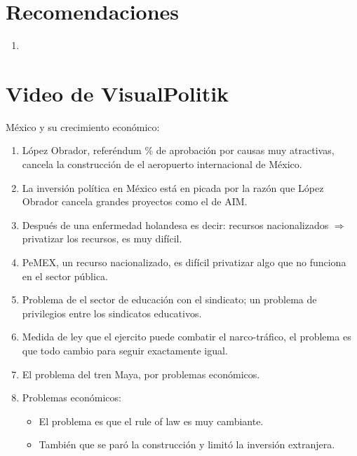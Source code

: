 \section{Recomendaciones}
\begin{enumerate}
    \item   
\end{enumerate}

\section{Video de VisualPolitik}
México y su crecimiento económico:
\begin{enumerate}
    \item López Obrador, referéndum \% de aprobación por causas muy atractivas, cancela la construcción de el aeropuerto internacional de México.
    \item La inversión política en México está en picada por la razón que López Obrador cancela grandes proyectos como el de AIM.
    \item Después de una enfermedad holandesa es decir: recursos nacionalizados $\Rightarrow$ privatizar los recursos, es muy difícil.
    \item PeMEX, un recurso nacionalizado, es difícil privatizar algo que no funciona en el sector pública.
    \item Problema de el sector de educación con el sindicato; un problema de privilegios entre los sindicatos educativos.
    \item Medida de ley que el ejercito puede combatir el narco-tráfico, el problema es que todo cambio para seguir exactamente igual.
    \item El problema del tren Maya, por problemas económicos.
    \item Problemas económicos:
        \begin{itemize}
            \item El problema es que el rule of law es muy cambiante.
            \item También que se paró la construcción y limitó la inversión extranjera.
        \end{itemize}
\end{enumerate}
